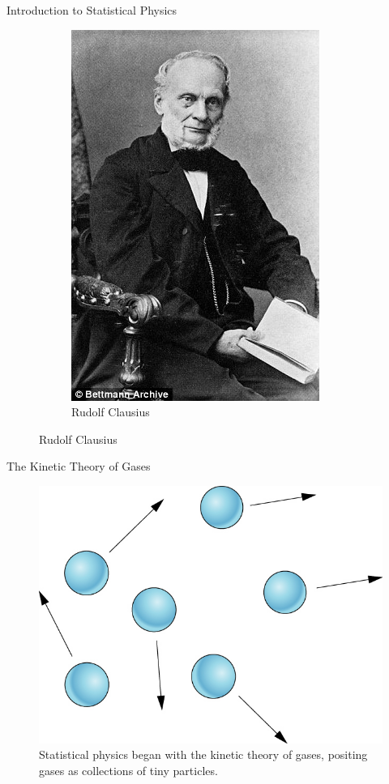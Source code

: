 \documentclass{beamer}
\begin{document}
\begin{frame}{Introduction to Statistical Physics}
\begin{figure}[h!]
\begin{subfigure}[b]{0.25\linewidth}
      \includegraphics[width=\linewidth]{figures/clausius.jpeg}
      \caption{Rudolf Clausius~\cite{clausius}}
    \end{subfigure}
    \label{fig:the-greats}
  \end{figure}
\end{frame}

\begin{frame}{The Kinetic Theory of Gases}
  \begin{figure}[ht]
    \centering \includegraphics[width=0.5\linewidth]{figures/gas.jpg}
    \caption{Statistical physics began with the kinetic theory of
      gases, positing gases as collections of tiny
      particles\label{fig:label}.}
  \end{figure}
\end{frame}
\end{document}
